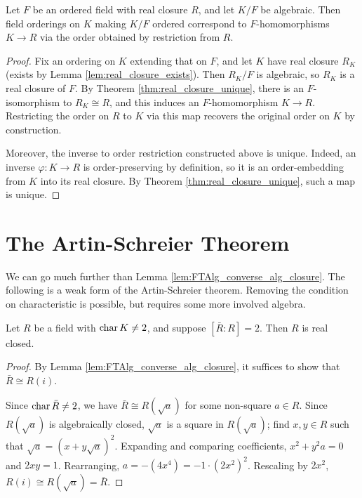 \begin{lemma}
  \label{lem:ord_alg_ext_eq_emb}
  Let $F$ be an ordered field with real closure $R$, and let $K/F$ be algebraic. Then field orderings on $K$ making $K/F$ ordered correspond to $F$-homomorphisms $K\to R$ via the order obtained by restriction from $R$.
\end{lemma}
\begin{proof}
  Fix an ordering on $K$ extending that on $F$, and let $K$ have real closure $R_K$ (exists by Lemma \ref{lem:real_closure_exists}). Then $R_K/F$ is algebraic, so $R_K$ is a real closure of $F$. By Theorem \ref{thm:real_closure_unique}, there is an $F$-isomorphism to $R_K\cong R$, and this induces an $F$-homomorphism $K\to R$. Restricting the order on $R$ to $K$ via this map recovers the original order on $K$ by construction.
  
  Moreover, the inverse to order restriction constructed above is unique. Indeed, an inverse $\varphi:K\to R$ is order-preserving by definition, so it is an order-embedding from $K$ into its real closure. By Theorem \ref{thm:real_closure_unique}, such a map is unique.
\end{proof}

\section{The Artin-Schreier Theorem}

We can go much further than Lemma \ref{lem:FTAlg_converse_alg_closure}. The following is a weak form of the Artin-Schreier theorem. Removing the condition on characteristic is possible, but requires some more involved algebra.

\begin{theorem}
  \label{thm:Artin-Schreier_weak}
  \leanok
  Let $R$ be a field with $\operatorname{char} K\neq2$, and suppose $[\bar{R}:R]=2$. Then $R$ is real closed.
\end{theorem}
\begin{proof}
  By Lemma \ref{lem:FTAlg_converse_alg_closure}, it suffices to show that $\bar{R}\cong R(i)$.

  Since $\operatorname{char}\bar{R}\neq 2$, we have $\bar{R}\cong R(\sqrt{a})$ for some non-square $a\in R$. Since $R(\sqrt{a})$ is algebraically closed, $\sqrt{a}$ is a square in $R(\sqrt{a})$; find $x,y\in R$ such that $\sqrt{a}=(x+y\sqrt{a})^2$. Expanding and comparing coefficients, $x^2+y^2a=0$ and $2xy=1$. Rearranging, $a=-(4x^4)=-1\cdot(2x^2)^2$. Rescaling by $2x^2$, $R(i)\cong R(\sqrt{a})=\bar{R}$.
\end{proof}

